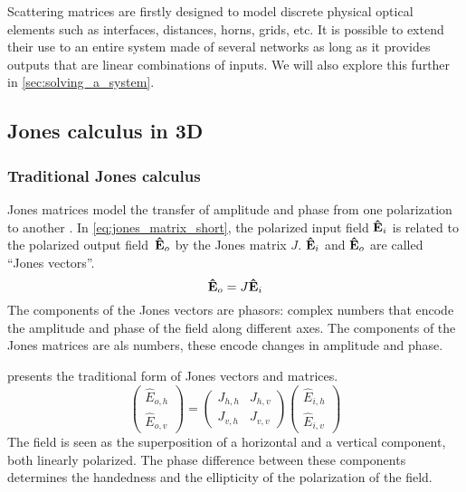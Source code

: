 Scattering matrices are firstly designed to model discrete physical optical elements such as interfaces, distances, horns, grids, etc.
It is possible to extend their use to an entire system made of several networks as long as it provides outputs that are linear combinations of inputs.
We will also explore this further in \cref{sec:solving_a_system}.

\subsection{Jones calculus in 3D}

\subsubsection{Traditional Jones calculus}
Jones matrices model the transfer of amplitude and phase from one polarization to another \cite{hecht2002optics}.
In \cref{eq:jones_matrix_short}, the polarized input field $\mathbf{\hat{E}}_i$ is related to the polarized output field~$\mathbf{\hat{E}}_o$ by the Jones matrix $J$.
$\mathbf{\hat{E}}_i$ and $\mathbf{\hat{E}}_o$ are called ``Jones vectors''.
\begin{equation}
    \mathbf{\hat{E}}_o = J \mathbf{\hat{E}}_i
    \label{eq:jones_matrix_short}
\end{equation}
The components of the Jones vectors are phasors: complex numbers that encode the amplitude and phase of the field along different axes.
The components of the Jones matrices are als numbers, these encode changes in amplitude and phase.

 presents the traditional form of Jones vectors and matrices.
\begin{equation}
    \begin{pmatrix}
        \hat{E}_{o, h}\\
        \hat{E}_{o, v}
    \end{pmatrix}
    =
    \begin{pmatrix}
        J_{h, h}   &   J_{h, v} \\
        J_{v, h}   &   J_{v, v}
    \end{pmatrix}
    \begin{pmatrix}
        \hat{E}_{i, h}\\
        \hat{E}_{i, v}
    \end{pmatrix}
    \label{eq:jones_matrix_2d}
\end{equation}
The field is seen as the superposition of a horizontal and a vertical component, both linearly polarized.
The phase difference between these components determines the handedness and the ellipticity of the polarization of the field.

